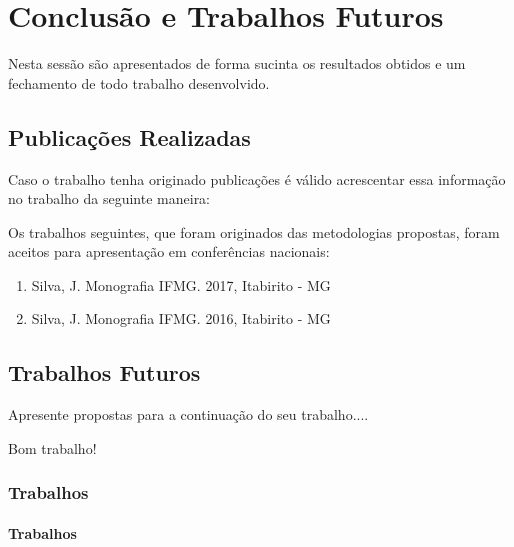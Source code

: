 
\chapter{Conclusão e Trabalhos Futuros}\label{conclusao}

Nesta sessão são apresentados de forma sucinta os resultados obtidos e um fechamento de todo trabalho desenvolvido.



\section{Publicações Realizadas}\label{publicacoes}

Caso o trabalho tenha originado publicações é válido acrescentar essa informação no trabalho da seguinte maneira:

Os trabalhos seguintes, que foram originados das metodologias propostas, foram aceitos para apresentação em conferências nacionais:

\begin{enumerate}
   \item Silva, J. Monografia IFMG. 2017, Itabirito - MG
   \item Silva, J. Monografia IFMG. 2016, Itabirito - MG  
\end{enumerate}

\section{Trabalhos Futuros}\label{trabalhosFuturos}

Apresente propostas para a continuação do seu trabalho....

\vspace{4cm}
\begin{center}
    \Large Bom trabalho! 
    
    \dSmiley[5][yellow]
\end{center}

\subsection{Trabalhos} 

\subsubsection{Trabalhos} 